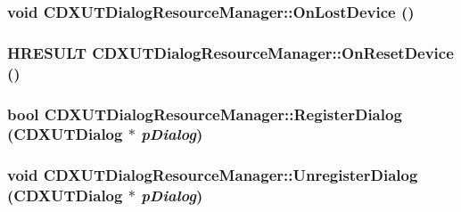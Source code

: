\label{class_c_d_x_u_t_dialog_resource_manager_aaf6a1da79ca795d3df60142f985d39f0}
\hypertarget{class_c_d_x_u_t_dialog_resource_manager_a767126a6b445f88b4e31d26dde9c3e9d}{
\subsubsection[{OnLostDevice}]{\setlength{\rightskip}{0pt plus 5cm}void CDXUTDialogResourceManager::OnLostDevice ()}}
\label{class_c_d_x_u_t_dialog_resource_manager_a767126a6b445f88b4e31d26dde9c3e9d}
\hypertarget{class_c_d_x_u_t_dialog_resource_manager_adda18af6feb1f6426f838949764b758c}{
\subsubsection[{OnResetDevice}]{\setlength{\rightskip}{0pt plus 5cm}HRESULT CDXUTDialogResourceManager::OnResetDevice ()}}
\label{class_c_d_x_u_t_dialog_resource_manager_adda18af6feb1f6426f838949764b758c}
\hypertarget{class_c_d_x_u_t_dialog_resource_manager_a316e3fb9e1a6a5115b4e7e0e94952150}{
\subsubsection[{RegisterDialog}]{\setlength{\rightskip}{0pt plus 5cm}bool CDXUTDialogResourceManager::RegisterDialog ({\bf CDXUTDialog} $\ast$ {\em pDialog})}}
\label{class_c_d_x_u_t_dialog_resource_manager_a316e3fb9e1a6a5115b4e7e0e94952150}
\hypertarget{class_c_d_x_u_t_dialog_resource_manager_a82c0f8904b95862f2bcf6c6231b7c75f}{
\subsubsection[{UnregisterDialog}]{\setlength{\rightskip}{0pt plus 5cm}void CDXUTDialogResourceManager::UnregisterDialog ({\bf CDXUTDialog} $\ast$ {\em pDialog})}}
\label{class_c_d_x_u_t_dialog_resource_manager_a82c0f8904b95862f2bcf6c6231b7c75f}


